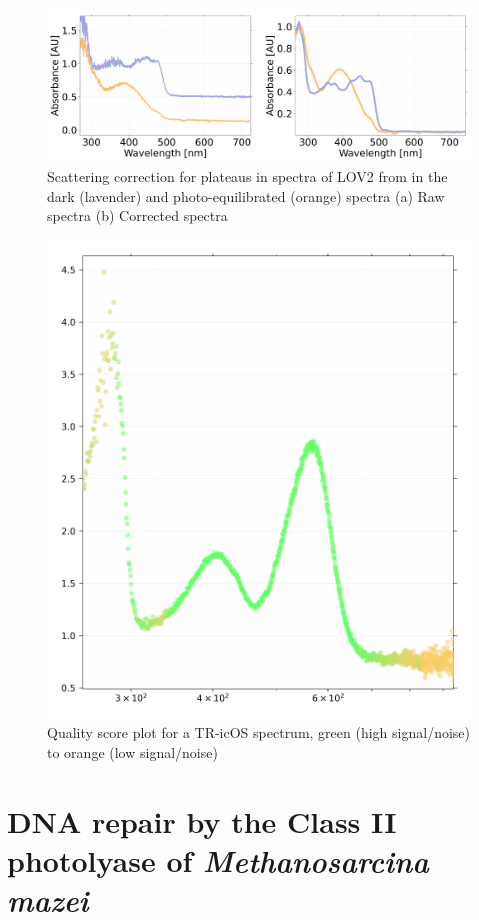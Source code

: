 \begin{figure}[H] %
    \centering
    \noindent \includegraphics[width=\textwidth]{images/Spectroscopy/icOS_toolbox_Fig.S4.pdf}
    \hfill
    \caption{Scattering correction for plateaus in spectra of LOV2 from \cite{aumonierSlowProteinDynamics2022} in the dark (lavender) and photo-equilibrated (orange) spectra (a) Raw spectra (b) Corrected spectra}
    \label{supfig:plateau_correction}
\end{figure}

\begin{figure}[H] %
    \centering
    \noindent \includegraphics[width=\textwidth]{images/Spectroscopy/quality_TR-icOS.pdf}
    \hfill
    \caption{Quality score plot for a TR-icOS spectrum, green (high signal/noise) to orange (low signal/noise)}
    \label{supfig:quality}
\end{figure}


\section{DNA repair by the Class II photolyase of \textit{Methanosarcina mazei}\label{sec:paperMmCPDII}}
